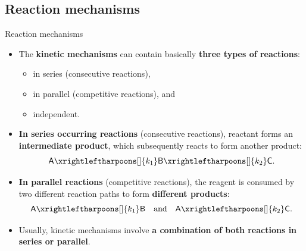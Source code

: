 \subsection{Reaction mechanisms}
%
%
\begin{frame}[<+->][shrink]{Reaction mechanisms}
	\begin{itemize}
		\item The \alert{\bf kinetic mechanisms} can contain basically {\bf three types of reactions}:
		\begin{itemize}
			\item in series (consecutive reactions), 
			\item in parallel (competitive reactions), and 
			\item independent.
		\end{itemize}
		\item \alert{\bf In series occurring reactions} (consecutive reactions), reactant forms an {\bf intermediate product}, which subsequently reacts to form another product:
		\[\mathsf{A} \xrightleftharpoons[]{k_1} \mathsf{B} \xrightleftharpoons[]{k_2} \mathsf{C}. \]
		\item \alert{\bf In parallel reactions} (competitive reactions), the reagent is consumed by two different reaction paths to form {\bf different products}:
		\[\mathsf{A} \xrightleftharpoons[]{k_1} \mathsf{B} \quad \mbox{and}\quad \mathsf{A} \xrightleftharpoons[]{k_2} \mathsf{C}. \]
		\item Usually, kinetic mechanisms involve {\bf a combination of both reactions in series or parallel}.
	\end{itemize}
\end{frame}
%
%
